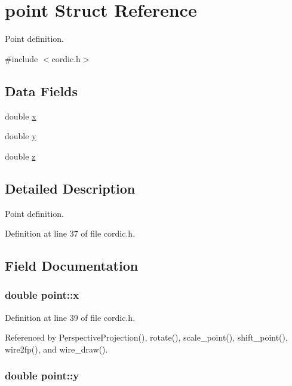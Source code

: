 \hypertarget{structpoint}{}\section{point Struct Reference}
\label{structpoint}


Point definition.  




{\ttfamily \#include $<$cordic.\+h$>$}

\subsection*{Data Fields}
\begin{DoxyCompactItemize}
\item 
double \hyperlink{structpoint_a9c6b34deaf4900ad4193c17935fd384a}{x}
\item 
double \hyperlink{structpoint_a613f8f0d7352731638b0094e1b958b87}{y}
\item 
double \hyperlink{structpoint_aab1f0c3682401083b5bf252e7001874f}{z}
\end{DoxyCompactItemize}


\subsection{Detailed Description}
Point definition. 

Definition at line 37 of file cordic.\+h.



\subsection{Field Documentation}
\subsubsection[{\texorpdfstring{x}{x}}]{\setlength{\rightskip}{0pt plus 5cm}double point\+::x}\hypertarget{structpoint_a9c6b34deaf4900ad4193c17935fd384a}{}\label{structpoint_a9c6b34deaf4900ad4193c17935fd384a}


Definition at line 39 of file cordic.\+h.



Referenced by Perspective\+Projection(), rotate(), scale\+\_\+point(), shift\+\_\+point(), wire2fp(), and wire\+\_\+draw().

\subsubsection[{\texorpdfstring{y}{y}}]{\setlength{\rightskip}{0pt plus 5cm}double point\+::y}\hypertarget{structpoint_a613f8f0d7352731638b0094e1b958b87}{}\label{structpoint_a613f8f0d7352731638b0094e1b958b87}


